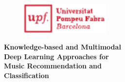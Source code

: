 
\newpage
\thispagestyle{empty}
\begin{titlingpage}
\begin{flushright}

  \begin{figure}[t]
    \begin{flushright}
      \includegraphics[width=4.5cm]{ch00/pics/upf-logo-bo}
    \end{flushright}
  \end{figure}

  \vspace*{2.2cm} 


  {\huge \textbf{Knowledge-based and Multimodal  \\ \vspace*{0.05cm} Deep Learning Approaches for \\ \vspace*{0.10cm} Music Recommendation and \\ \vspace*{0.40cm} Classification}}


\end{flushright}
\end{titlingpage}
